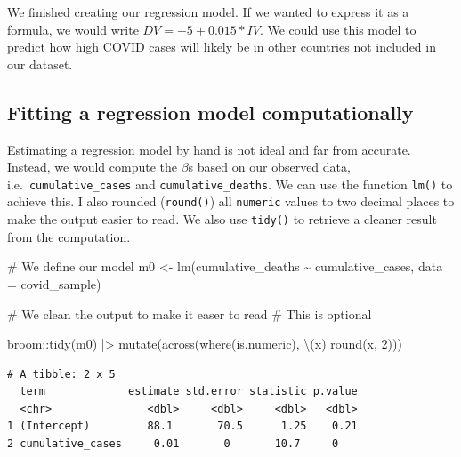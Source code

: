 \documentclass[
  letterpaper,
  DIV=11,
  numbers=noendperiod]{scrreprt}
\newenvironment{Shaded}{\begin{snugshade}}{\end{snugshade}}
\newcommand{\AttributeTok}[1]{\textcolor[rgb]{0.40,0.45,0.13}{#1}}
\newcommand{\CommentTok}[1]{\textcolor[rgb]{0.37,0.37,0.37}{#1}}
\newcommand{\DecValTok}[1]{\textcolor[rgb]{0.68,0.00,0.00}{#1}}
\newcommand{\FunctionTok}[1]{\textcolor[rgb]{0.28,0.35,0.67}{#1}}
\newcommand{\NormalTok}[1]{\textcolor[rgb]{0.00,0.23,0.31}{#1}}
\newcommand{\OtherTok}[1]{\textcolor[rgb]{0.00,0.23,0.31}{#1}}
\newcommand{\SpecialCharTok}[1]{\textcolor[rgb]{0.37,0.37,0.37}{#1}}
\begin{document}
We finished creating our regression model. If we wanted to express it as
a formula, we would write \(DV = -5 + 0.015 * IV\). We could use this
model to predict how high COVID cases will likely be in other countries
not included in our dataset.

\subsection{Fitting a regression model
computationally}\label{sec-fitting-a-regression-model-computationally}

Estimating a regression model by hand is not ideal and far from
accurate. Instead, we would compute the \(\beta\)s based on our observed
data, i.e.~\texttt{cumulative\_cases} and \texttt{cumulative\_deaths}.
We can use the function \texttt{lm()} to achieve this. I also rounded
(\texttt{round()}) all \texttt{numeric} values to two decimal places to
make the output easier to read. We also use \texttt{tidy()} to retrieve
a cleaner result from the computation.

\begin{Shaded}
\begin{Highlighting}[]
\CommentTok{\# We define our model}
\NormalTok{m0 }\OtherTok{\textless{}{-}} \FunctionTok{lm}\NormalTok{(cumulative\_deaths }\SpecialCharTok{\textasciitilde{}}\NormalTok{ cumulative\_cases, }\AttributeTok{data =}\NormalTok{ covid\_sample)}

\CommentTok{\# We clean the output to make it easer to read}
\CommentTok{\# This is optional}

\NormalTok{broom}\SpecialCharTok{::}\FunctionTok{tidy}\NormalTok{(m0) }\SpecialCharTok{|\textgreater{}}
  \FunctionTok{mutate}\NormalTok{(}\FunctionTok{across}\NormalTok{(}\FunctionTok{where}\NormalTok{(is.numeric), \textbackslash{}(x) }\FunctionTok{round}\NormalTok{(x, }\DecValTok{2}\NormalTok{)))}
\end{Highlighting}
\end{Shaded}

\begin{verbatim}
# A tibble: 2 x 5
  term             estimate std.error statistic p.value
  <chr>               <dbl>     <dbl>     <dbl>   <dbl>
1 (Intercept)         88.1       70.5      1.25    0.21
2 cumulative_cases     0.01       0       10.7     0   
\end{verbatim}
\end{document}
